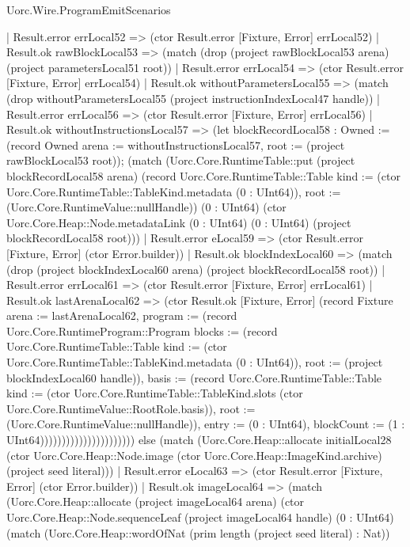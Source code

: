 \begin{lexlean}{Uorc.Wire.ProgramEmitScenarios}
\begin{semanticmodule}
{                      | Result.error errLocal52 => (ctor Result.error [Fixture, Error] errLocal52)
                      | Result.ok rawBlockLocal53 => (match (drop (project rawBlockLocal53 arena) (project parametersLocal51 root))
                        | Result.error errLocal54 => (ctor Result.error [Fixture, Error] errLocal54)
                        | Result.ok withoutParametersLocal55 => (match (drop withoutParametersLocal55 (project instructionIndexLocal47 handle))
                          | Result.error errLocal56 => (ctor Result.error [Fixture, Error] errLocal56)
                          | Result.ok withoutInstructionsLocal57 => (let blockRecordLocal58 : Owned := (record Owned {arena := withoutInstructionsLocal57, root := (project rawBlockLocal53 root)}); (match (Uorc.Core.RuntimeTable::put (project blockRecordLocal58 arena) (record Uorc.Core.RuntimeTable::Table {kind := (ctor Uorc.Core.RuntimeTable::TableKind.metadata (0 : UInt64)), root := (Uorc.Core.RuntimeValue::nullHandle)}) (0 : UInt64) (ctor Uorc.Core.Heap::Node.metadataLink (0 : UInt64) (0 : UInt64) (project blockRecordLocal58 root)))
                            | Result.error eLocal59 => (ctor Result.error [Fixture, Error] (ctor Error.builder))
                            | Result.ok blockIndexLocal60 => (match (drop (project blockIndexLocal60 arena) (project blockRecordLocal58 root))
                              | Result.error errLocal61 => (ctor Result.error [Fixture, Error] errLocal61)
                              | Result.ok lastArenaLocal62 => (ctor Result.ok [Fixture, Error] (record Fixture {arena := lastArenaLocal62, program := (record Uorc.Core.RuntimeProgram::Program {blocks := (record Uorc.Core.RuntimeTable::Table {kind := (ctor Uorc.Core.RuntimeTable::TableKind.metadata (0 : UInt64)), root := (project blockIndexLocal60 handle)}), basis := (record Uorc.Core.RuntimeTable::Table {kind := (ctor Uorc.Core.RuntimeTable::TableKind.slots (ctor Uorc.Core.RuntimeValue::RootRole.basis)), root := (Uorc.Core.RuntimeValue::nullHandle)}), entry := (0 : UInt64), blockCount := (1 : UInt64)})})))))))))))))))))))) else (match (Uorc.Core.Heap::allocate initialLocal28 (ctor Uorc.Core.Heap::Node.image (ctor Uorc.Core.Heap::ImageKind.archive) (project seed literal)))
    | Result.error eLocal63 => (ctor Result.error [Fixture, Error] (ctor Error.builder))
    | Result.ok imageLocal64 => (match (Uorc.Core.Heap::allocate (project imageLocal64 arena) (ctor Uorc.Core.Heap::Node.sequenceLeaf (project imageLocal64 handle) (0 : UInt64) (match (Uorc.Core.Heap::wordOfNat (prim length (project seed literal) : Nat))
}
\end{semanticmodule}
\end{lexlean}
